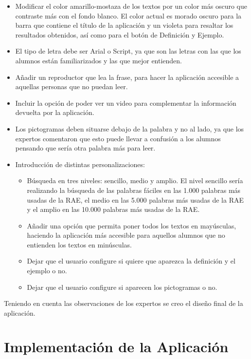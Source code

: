\begin{itemize} 
	\item Modificar el color amarillo-mostaza de los textos por un color más oscuro que contraste más con el fondo blanco. El color actual es morado oscuro para la barra que contiene el título de la aplicación y un violeta para resaltar los resultados obtenidos, así como para el botón de Definición y Ejemplo.
	\item El tipo de letra debe ser Arial o Script, ya que son las letras con las que los alumnos están familiarizados y las que mejor entienden.
	\item Añadir un reproductor que lea la frase, para hacer la aplicación accesible a aquellas personas que no puedan leer.
	\item Incluir la opción de poder ver un video para complementar la información devuelta por la aplicación.
	\item Los pictogramas deben situarse debajo de la palabra y no al lado, ya que los expertos comentaron que esto puede llevar a confusión a los alumnos pensando que sería otra palabra más para leer. 
	\item Introducción de distintas personalizaciones:
	\begin{itemize}
		\item Búsqueda en tres niveles: sencillo, medio y amplio. El nivel sencillo sería realizando la búsqueda de las palabras fáciles en las 1.000 palabras más usadas de la RAE, el medio en las 5.000 palabras más usadas de la RAE y el amplio en las 10.000 palabras más usadas de la RAE. 
		\item Añadir una opción que permita poner todos los textos en mayúsculas, haciendo la aplicación más accesible para aquellos alumnos que no entienden los textos en minúsculas.
		\item Dejar que el usuario configure si quiere que aparezca la definición y el ejemplo o no.
		\item Dejar que el usuario configure  si aparecen los pictogramas o no.
	\end{itemize}
\end{itemize}

Teniendo en cuenta las observaciones de los expertos se creo el diseño final de la aplicación.





\section{Implementación de la Aplicación}
\label{cap:sec:implementacionApp}

